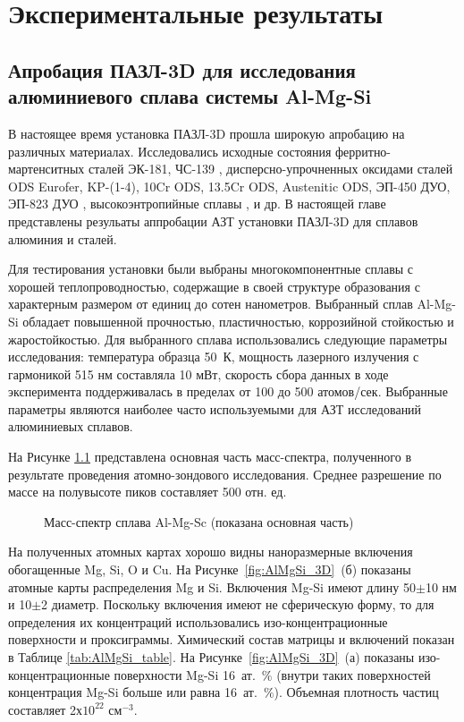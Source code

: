 \chapter{Экспериментальные результаты}\label{ch:ch4}

\section{Апробация ПАЗЛ-3D для исследования алюминиевого сплава системы Al-Mg-Si}\label{sec:ch4/sect1}

В настоящее время установка ПАЗЛ-3D прошла широкую апробацию на различных материалах. Исследовались исходные состояния ферритно-мартенситных сталей ЭК-181, ЧС-139 \cite{Rogozhkin19}, дисперсно-упрочненных оксидами сталей ODS Eurofer, KP-(1-4), 10Cr ODS, 13.5Cr ODS, Austenitic ODS, ЭП-450 ДУО, ЭП-823 ДУО \cite{Rogozhkin24,Rogozhkin22},  высокоэнтропийные сплавы \cite{Rogozhkin20}, и др. В настоящей главе представлены резульаты аппробации АЗТ установки ПАЗЛ-3D для сплавов алюминия и сталей.

Для тестирования установки были выбраны многокомпонентные сплавы с хорошей теплопроводностью, содержащие в своей структуре образования с характерным размером от единиц до сотен нанометров. Выбранный сплав Al-Mg-Si обладает повышенной прочностью, пластичностью, коррозийной стойкостью и жаростойкостью. Для выбранного сплава использовались следующие параметры исследования: температура образца 50~К, мощность лазерного излучения с гармоникой 515 нм составляла 10 мВт, скорость сбора данных в ходе эксперимента поддерживалась в пределах от 100 до 500 атомов/сек. Выбранные параметры являются наиболее часто используемыми для АЗТ исследований алюминиевых сплавов.

На Рисунке \cref{fig:AlMgSi_mass} представлена основная часть масс-спектра, полученного в результате проведения атомно-зондового исследования. Среднее разрешение по массе на полувысоте пиков составляет 500 отн. ед.

\begin{figure}[htb]
	\caption{Масс-спектр сплава Al-Mg-Sc (показана основная часть)\cite{scbibAlumYAFI}}
	\label{fig:AlMgSi_mass}
\end{figure} 
\FloatBarrier

На полученных атомных картах хорошо видны наноразмерные включения обогащенные Mg, Si, O и Cu. На Рисунке~\cref{fig:AlMgSi_3D}~(б) показаны атомные карты распределения Mg и Si. Включения Mg-Si имеют длину 50$\pm$10 нм и 10$\pm$2 диаметр. Поскольку включения имеют не сферическую форму, то для определения их концентраций использовались изо-концентрационные поверхности и проксиграммы. Химический состав матрицы и включений показан в Таблице \cref{tab:AlMgSi_table}. На Рисунке~\cref{fig:AlMgSi_3D}~(а) показаны изо-концентрационные поверхности Mg-Si 16~ат.~$\%$ (внутри таких поверхностей концентрация Mg-Si больше или равна 16~ат.~$\%$). Объемная плотность частиц составляет 2х$10^{22}$ см$^{-3}$.


